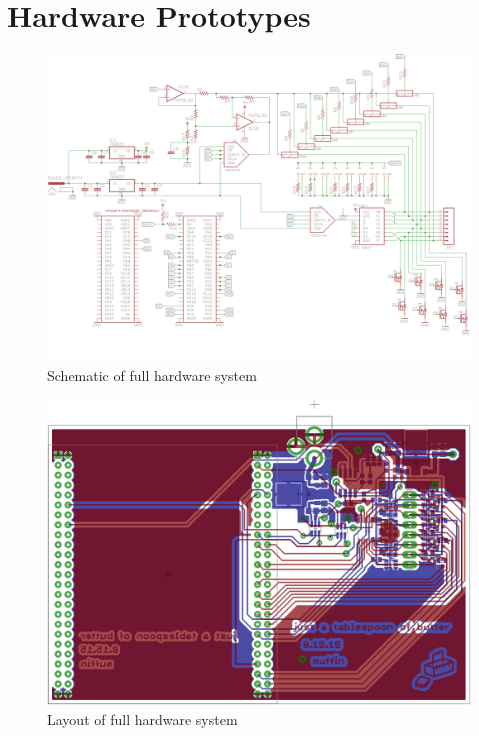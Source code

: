 \documentclass[11pt,twoside]{mitthesis}
\begin{document}
\section{Hardware Prototypes}

\begin{figure}[h]
  \begin{center}
      \includegraphics[width=1.08\textwidth, angle =90]{../schem1.png}
      \caption{Schematic of full hardware system}
  \end{center}
\end{figure}

\begin{figure}[h]
  \begin{center}
      \includegraphics[width=.9\textwidth]{../layout-tb.png}
      \caption{Layout of full hardware system}
  \end{center}
\end{figure}
\end{document}
